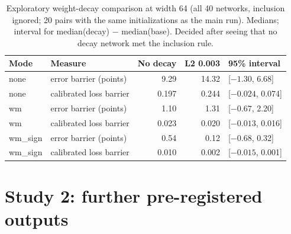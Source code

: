 \documentclass[11pt]{article}
\newcommand{\md}[1]{\textsf{#1}}
\begin{document}
\begin{table}[H]
\centering
\small
\caption{Exploratory weight-decay comparison at width 64 (all 40 networks, inclusion ignored; 20 pairs with the same initializations as the main run). Medians; interval for median(decay) $-$ median(base). Decided after seeing that no decay network met the inclusion rule.}
\begin{tabular}{@{}llrrl@{}}
\toprule
Mode & Measure & No decay & L2 0.003 & 95\% interval \\
\midrule
\md{none} & error barrier (points) & 9.29 & 14.32 & [$-1.30$, 6.68] \\
\md{none} & calibrated loss barrier & 0.197 & 0.244 & [$-0.024$, 0.074] \\
\md{wm} & error barrier (points) & 1.10 & 1.31 & [$-0.67$, 2.20] \\
\md{wm} & calibrated loss barrier & 0.023 & 0.020 & [$-0.013$, 0.016] \\
\md{wm\_sign} & error barrier (points) & 0.54 & 0.12 & [$-0.68$, 0.32] \\
\md{wm\_sign} & calibrated loss barrier & 0.010 & 0.002 & [$-0.015$, 0.001] \\
\bottomrule
\end{tabular}
\end{table}

\section{Study 2: further pre-registered outputs}
\label{app:v2more}
\end{document}
